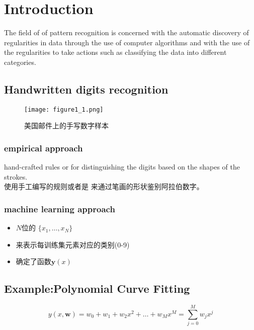 \documentclass[cyan]{YuNote}
\begin{document}
\tableofcontents
\chapter{Introduction}
The field of of pattern recognition is concerned with the automatic discovery of regularities in data through the use of computer algorithms and with the use of the regularities to take actions such as classifying the data into different categories.

\section{Handwritten digits recognition} 

\begin{figure}[!hbtp]
\center
\texttt{[image: figure1\_1.png]}
\caption{美国邮件上的手写数字样本}
\end{figure}

\subsection{empirical approach}
\begin{newpara}
hand-crafted rules or  for distinguishing the digits based on the shapes of the strokes.\\
使用手工编写的规则或者是 来通过笔画的形状鉴别阿拉伯数字。
\end{newpara}

\subsection{machine learning approach}
\begin{itemize}
\item$N$位的 $\lbrace x_1,\ldots,x_N\rbrace$
\item {}来表示每训练集元素对应的类别(0-9)
\item {}确定了函数$\textbf{y}(x)$
\end{itemize}


\section{Example:Polynomial Curve Fitting}
\begin{equation}
y(x,\textbf{w})=w_0+w_1+w_2x^2+\ldots+w_Mx^M=\sum_{j=0}^M w_jx^j
\end{equation}
\end{document}
